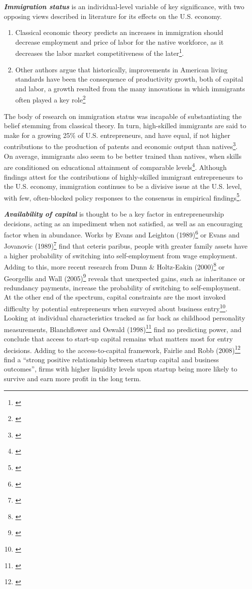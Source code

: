 \textbf{\textit{Immigration status}} is an individual-level variable of key significance, with two opposing views described in literature for its effects on the U.S. economy.
\renewcommand{\labelenumi}{\roman{enumi}}
\begin{enumerate}
  \item Classical economic theory predicts an increases in immigration should decrease employment and price of labor for the native workforce, as it decreases the labor market competitiveness of the later\footnote{\cite{Hanson2012}}. 
  \item Other authors argue that historically, improvements in American living standards have been the consequence of productivity growth, both of capital and labor, a growth resulted from the many innovations in which immigrants often played a key role\footnote{\cite{jones1995culture}}
\end{enumerate}
The body of research on immigration status was incapable of substantiating the belief stemming from classical theory. In turn, high-skilled immigrants are said to make for a growing 25\% of U.S. entrepreneurs, and have equal, if not higher contributions to the production of patents and economic output than natives\footnote{\cite{Kerr2013}}. On average, immigrants also seem to be better trained than natives, when skills are conditioned on educational attainment of comparable levels\footnote{\cite{Kerr2013}}. Although findings attest for the contributions of highly-skilled immigrant entrepreneurs to the U.S. economy, immigration continues to be a divisive issue at the U.S. level, with few, often-blocked policy responses to the consensus in empirical findings\footnote{\cite{Hanson2012}}. 

\textbf{\textit{Availability of capital}} is thought to be a key factor in entrepreneurship decisions, acting as an impediment when not satisfied, as well as an encouraging factor when in abundance. Works by Evans and Leighton (1989)\footnote{\cite{EvansLeighton1989}} or Evans and Jovanovic (1989)\footnote{\cite{EvansJovanovic1989}} find that ceteris paribus, people with greater family assets have a higher probability of switching into self-employment from wage employment. Adding to this, more recent research from Dunn & Holtz-Eakin (2000)\footnote{\cite{DunnHoltzEakin2000}} or Georgellis and Wall (2005)\footnote{\cite{GeorgellisWall2005}} reveals that unexpected gains, such as inheritance or redundancy payments, increase the probability of switching to self-employment. At the other end of the spectrum, capital constraints are the most invoked difficulty by potential entrepreneurs when surveyed about business entry\footnote{\cite{BlanchflowerOswald1998}}. Looking at individual characteristics tracked as far back as childhood personality measurements, Blanchflower and Oswald (1998)\footnote{\cite{BlanchflowerOswald1998}} find no predicting power, and conclude that access to start-up capital remains what matters most for entry decisions. Adding to the access-to-capital framework, Fairlie and Robb (2008)\footnote{\cite{FairlieRobb2008}} find a ``strong positive relationship between startup capital and business outcomes'', firms with higher liquidity levels upon startup being more likely to survive and earn more profit in the long term.

